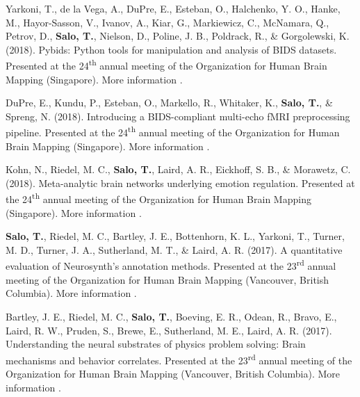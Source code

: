 \documentclass[10pt]{article}
\newcommand{\textlink}[3][blue]{\href{#2}{\color{#1}{#3}}}
\begin{document}
\begin{hangparas}{.25in}{1}
	\bigskip

	Yarkoni, T., de la Vega, A., DuPre, E., Esteban, O., Halchenko, Y. O.,
	Hanke, M., Hayor-Sasson, V., Ivanov, A., Kiar, G., Markiewicz, C., McNamara, Q.,
	Petrov, D., \textbf{Salo, T.}, Nielson, D., Poline, J. B., Poldrack, R.,
	\& Gorgolewski, K. (2018).
	Pybids: Python tools for manipulation and analysis of BIDS datasets.
	Presented at the 24\textsuperscript{th} annual meeting of the Organization
	for Human Brain Mapping (Singapore).
	More information
	\textlink{https://ww5.aievolution.com/hbm1801/index.cfm?do=abs.viewAbs&abs=3300}{here}.

	\bigskip

	DuPre, E., Kundu, P., Esteban, O., Markello, R., Whitaker, K.,
	\textbf{Salo, T.}, \& Spreng, N. (2018).
	Introducing a BIDS-compliant multi-echo fMRI preprocessing pipeline.
	Presented at the 24\textsuperscript{th} annual meeting of the Organization
	for Human Brain Mapping (Singapore).
	More information
	\textlink{https://ww5.aievolution.com/hbm1801/index.cfm?do=abs.viewAbs&abs=2789}{here}.

	\bigskip

	Kohn, N., Riedel, M. C., \textbf{Salo, T.}, Laird, A. R., Eickhoff, S. B.,
	\& Morawetz, C. (2018).
	Meta-analytic brain networks underlying emotion regulation.
	Presented at the 24\textsuperscript{th} annual meeting of the Organization
	for Human Brain Mapping (Singapore).
	More information
	\textlink{https://ww5.aievolution.com/hbm1801/index.cfm?do=abs.viewAbs&abs=1262}{here}.

	\bigskip

	\textbf{Salo, T.}, Riedel, M. C., Bartley, J. E., Bottenhorn, K. L., Yarkoni, T.,
	Turner, M. D., Turner, J. A., Sutherland, M. T., \& Laird, A. R. (2017).
	A quantitative evaluation of Neurosynth's annotation methods. Presented at
	the 23\textsuperscript{rd} annual meeting of the Organization for Human Brain
	Mapping (Vancouver, British Columbia).
	More information
	\textlink{https://nbclab.github.io/posters/salo-neurosynth-poster}{here}.

	\bigskip

	Bartley, J. E., Riedel, M. C., \textbf{Salo, T.}, Boeving, E. R., Odean, R.,
	Bravo, E., Laird, R. W., Pruden, S., Brewe, E., Sutherland, M. E.,
	Laird, A. R. (2017).
	Understanding the neural substrates of physics problem solving: Brain
	mechanisms and behavior correlates. Presented at the 23\textsuperscript{rd}
	annual meeting of the Organization for Human Brain Mapping (Vancouver, British
	Columbia).
	More information
	\textlink{https://nbclab.github.io/posters/bartley-physics-poster}{here}.


\end{hangparas}
\end{document}
